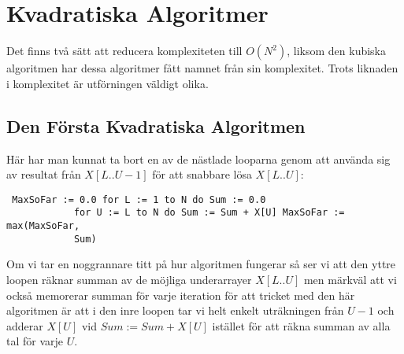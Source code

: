 \documentclass[a4paper,12pt]{article} \usepackage[swedish]{babel}
\begin{document}
            \section{Kvadratiska Algoritmer} Det finns två sätt att
            reducera komplexiteten till $O\left(N^2\right)$, liksom den
            kubiska algoritmen har dessa algoritmer fått namnet från sin
            komplexitet. Trots liknaden i komplexitet är utförningen
            väldigt olika. \label{kvadratisk} \subsection*{Den Första
            Kvadratiska Algoritmen} \label{sec:kvadratisk1} Här har man
            kunnat ta bort en av de nästlade looparna genom att använda sig
            av resultat från $X[L..U - 1]$ för att snabbare lösa $X[L..U]$:
            \begin{verbatim} MaxSoFar := 0.0 for L := 1 to N do Sum := 0.0
            for U := L to N do Sum := Sum + X[U] MaxSoFar := max(MaxSoFar,
            Sum) \end{verbatim} Om vi tar en noggrannare titt på hur
            algoritmen fungerar så ser vi att den yttre loopen räknar
            summan av de möjliga underarrayer $X[L..U]$ men märkväl att vi
            också memorerar summan för varje iteration för att tricket med
            den här algoritmen är att i den inre loopen tar vi helt enkelt
            uträkningen från $U - 1$ och adderar $X[U]$ vid $Sum := Sum +
            X[U]$ istället för att räkna summan av alla tal för varje $U$.
\end{document}
